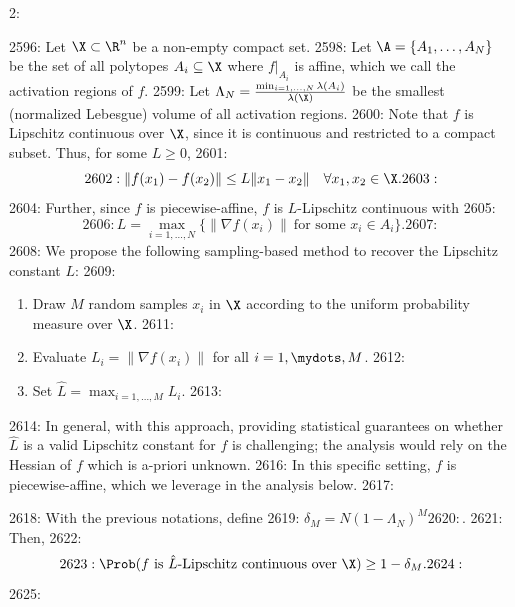 2: \documentclass[12pt]{l4dc2022} %
\begin{document}
2596: Let $\X\subset\R^n$ be a non-empty compact set. 
2598: Let $\A=\{A_1,\dots,A_N\}$ be the set of all polytopes $A_i\subseteq\X$ where $f|_{A_i}$ is affine, which we call the activation regions of $f$.  
2599: Let $\Lambda_N=\frac{\min_{i=1,\dots,N} \lambda(A_i)}{\lambda(\X)}$ be the smallest (normalized Lebesgue) volume of all activation regions. 
2600: Note that $f$ is Lipschitz continuous over $\X$, since it is continuous and restricted to a compact subset. Thus, for some $L\geq 0$,
2601: $$
2602: \|f(x_1)-f(x_2)\|\leq L\|x_1-x_2\|\quad \forall x_1,x_2\in\X.
2603: $$
2604: Further, since  $f$ is piecewise-affine, $f$ is $L$-Lipschitz continuous with 
2605: $$
2606: L=\max_{i=1,\dots,N} \{\|\nabla f(x_i)\|\ \text{for some }x_i\in A_i\}.
2607: $$
2608: We propose the following sampling-based method to recover the Lipschitz constant $L$:
2609: \begin{enumerate}\setlength\itemsep{0.5mm}
2610: \item Draw $M$ random samples $x_i$ in $\X$ according to the uniform probability measure over $\X$.
2611: \item Evaluate $L_i=\|\nabla f(x_i)\|$ for all $i=1,\mydots,M$.
2612: \item Set $\hat{L}=\max_{i=1,\dots,M} L_i$.
2613: \end{enumerate}
2614: In general, with this approach, providing statistical guarantees on whether $\hat{L}$ is a valid Lipschitz constant for $f$ is challenging; the analysis would rely on the Hessian of $f$ which is a-priori unknown. 
2616: In this specific setting, $f$ is piecewise-affine, which we leverage in the analysis below.
2617: \begin{lemma}
2618: With the previous notations, define 
2619: $\delta_M=N(1-\Lambda_N)^M
2620: $. 
2621: Then,
2622: $$
2623: \Prob(f\text{ is $\hat{L}$-Lipschitz continuous over $\X$})\geq 1-\delta_M.
2624: $$
2625: \end{lemma}
\end{document}
